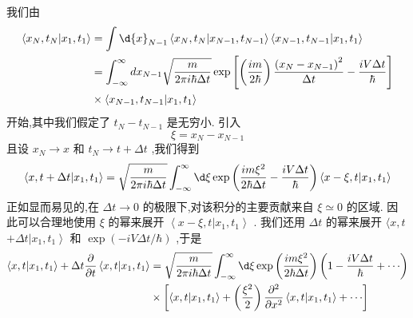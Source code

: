 \documentclass[lang=cn,newtx,10pt,scheme=chinese,thmcnt=section]{elegantbook}
\begin{document}
我们由
\begin{equation}
	\begin{aligned}
		\left\langle {{x}_{N},{t}_{N} | {x}_{1},{t}_{1}}\right\rangle &= \int \d{x}_{N - 1}\left\langle {{x}_{N},{t}_{N} | {x}_{N - 1},{t}_{N - 1}}\right\rangle \left\langle {{x}_{N - 1},{t}_{N - 1} | {x}_{1},{t}_{1}}\right\rangle\\
		&= \int_{-\infty }^{\infty }d{x}_{N - 1}\sqrt{\frac{m}{{2\pi i}\hbar {\Delta t}}}\exp \left\lbrack {\left( \frac{im}{2\hbar }\right) \frac{{\left( {x}_{N} - {x}_{N - 1}\right) }^{2}}{\Delta t} - \frac{iV\Delta t}{\hbar }}\right\rbrack\\
		&\times \left\langle {{x}_{N - 1},{t}_{N - 1} | {x}_{1},{t}_{1}}\right\rangle
	\end{aligned}
\end{equation}
开始,其中我们假定了 ${t}_{N} - {t}_{N - 1}$ 是无穷小. 引入
\begin{equation}
	\xi = {x}_{N} - {x}_{N - 1}
\end{equation}
且设 ${x}_{N} \rightarrow x$ 和 ${t}_{N} \rightarrow t + {\Delta t}$ ,我们得到
\begin{equation}
	\left\langle {x, t + {\Delta t} | {x}_{1},{t}_{1}}\right\rangle = \sqrt{\frac{m}{{2\pi i}\hbar {\Delta t}}}\int_{-\infty }^{\infty }{\d \xi }\exp \left( {\frac{{im}{\xi }^{2}}{2\hbar {\Delta t}} - \frac{iV\Delta t}{\hbar }}\right) \left\langle {x - \xi, t | {x}_{1},{t}_{1}}\right\rangle
\end{equation}
正如显而易见的,在 ${\Delta t} \rightarrow 0$ 的极限下,对该积分的主要贡献来自 $\xi \simeq 0$ 的区域. 因此可以合理地使用 $\xi$ 的幂来展开 $\left\langle {x - \xi, t | {x}_{1},{t}_{1}}\right\rangle$ . 我们还用 ${\Delta t}$ 的幂来展开 $\langle x, t$ $+ {\Delta t}\left| {{x}_{1},{t}_{1}}\right\rangle$ 和 $\exp \left( {-{iV\Delta t}/\hbar }\right)$ ,于是
\begin{equation}
	\begin{aligned}
		\left\langle {x, t | {x}_{1},{t}_{1}}\right\rangle + {\Delta t}\frac{\partial }{\partial t}\left\langle {x, t | {x}_{1},{t}_{1}}\right\rangle &= \sqrt{\frac{m}{{2\pi i}\hbar {\Delta t}}}\int_{-\infty }^{\infty }{\d \xi }\exp \left( \frac{{im}{\xi }^{2}}{2\hbar {\Delta t}}\right) \left( {1 - \frac{iV\Delta t}{\hbar } + \cdots }\right)\\
		&\times \left\lbrack {\left\langle {x, t | {x}_{1},{t}_{1}}\right\rangle + \left( \frac{{\xi }^{2}}{2}\right) \frac{{\partial }^{2}}{\partial {x}^{2}}\left\langle {x, t | {x}_{1},{t}_{1}}\right\rangle + \cdots }\right\rbrack
	\end{aligned}
\end{equation}
\end{document}
